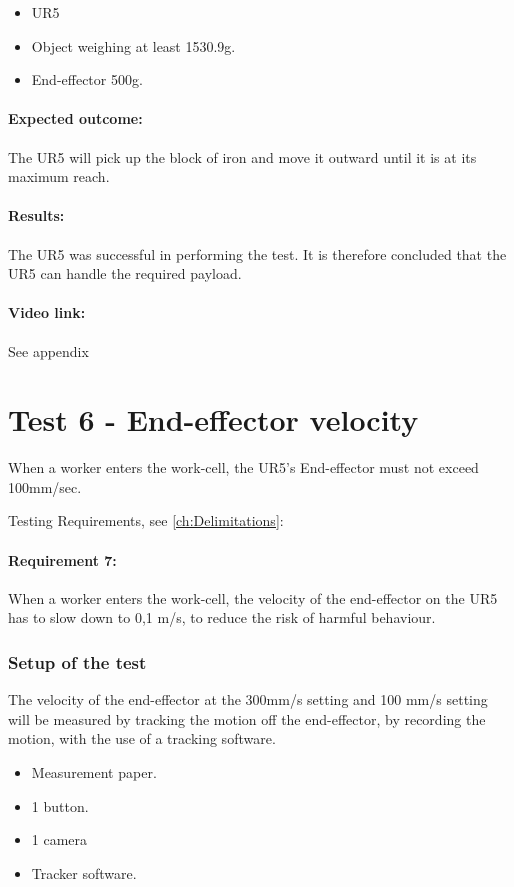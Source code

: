  \begin{itemize}
     \item UR5
     \item Object weighing at least 1530.9g.
     \item End-effector 500g.
 \end{itemize}
 
 \paragraph{Expected outcome:}
The UR5 will pick up the block of iron and move it outward until it is at its maximum reach. 

 
\paragraph{Results: }
The UR5 was successful in performing the test. It is therefore concluded that the UR5 can handle the required payload.\\ 

\paragraph{Video link: }
See appendix \cite{testfilm}

\section{Test 6 - End-effector velocity}
When a worker enters the work-cell, the UR5's End-effector must not exceed 100mm/sec.

Testing Requirements, see  \ref{ch:Delimitations}:

\paragraph{Requirement 7:} When a worker enters the work-cell, the velocity of the end-effector on the UR5 has to slow down to 0,1 m/s, to reduce the risk of harmful behaviour.\\

\subsubsection{Setup of the test}
The velocity of the end-effector at the  300mm/s setting and 100 mm/s setting will be measured by tracking the motion off the end-effector, by recording the motion, with the use of a tracking software.
\begin{itemize}
    \item Measurement paper.
    \item 1 button.
    \item 1 camera
    \item Tracker software.
\end{itemize}

